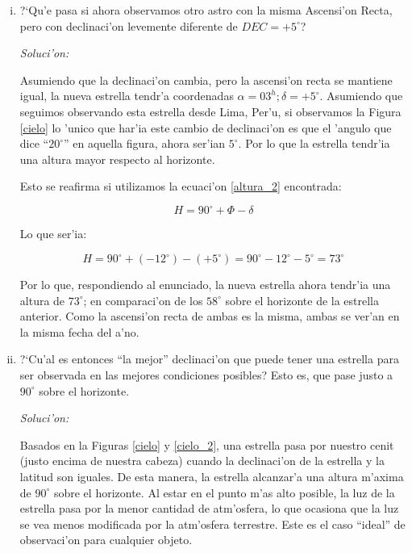 \documentclass{article}
\newenvironment{myfont}{\fontfamily{pnc}\selectfont}{\par}
\begin{document}
\begin{enumerate}[a)]
\begin{enumerate} [i)]
\begin{myfont}
\item ?`Qu'e pasa si ahora observamos otro astro con la misma Ascensi'on Recta, pero con declinaci'on levemente diferente de $DEC = +5^{\circ}$? \end{myfont}

\emph{Soluci'on:}

Asumiendo que la declinaci'on cambia, pero la ascensi'on recta se mantiene igual, la nueva estrella tendr'a coordenadas $\alpha = 03^h; \delta = +5^\circ$. Asumiendo que seguimos observando esta estrella desde Lima, Per'u, si observamos la Figura \ref{cielo} lo 'unico que har'ia este cambio de declinaci'on es que el 'angulo que dice ``$20^\circ$'' en aquella figura, ahora ser'ian $5^\circ$. Por lo que la estrella tendr'ia una altura mayor respecto al horizonte.

Esto se reafirma si utilizamos la ecuaci'on \eqref{altura_2} encontrada:

\begin{equation*}
H = 90^\circ + \Phi - \delta
\end{equation*}

Lo que ser'ia:

\begin{equation*}
H = 90^\circ + (-12^\circ) - (+5^\circ) = 90^\circ - 12^\circ - 5^\circ = 73^\circ
\end{equation*}

Por lo que, respondiendo al enunciado, la nueva estrella ahora tendr'ia una altura de $73^\circ$; en comparaci'on de los $58^\circ$ sobre el horizonte de la estrella anterior. Como la ascensi'on recta de ambas es la misma, ambas se ver'an en la misma fecha del a'no.

\begin{myfont}
\item ?`Cu'al es entonces ``la mejor'' declinaci'on que puede tener una estrella para ser observada en las mejores condiciones posibles? Esto es, que pase justo a $90^{\circ}$ sobre el horizonte. \end{myfont}

\emph{Soluci'on:}

Basados en la Figuras \ref{cielo} y \ref{cielo_2}, una estrella pasa por nuestro cenit (justo encima de nuestra cabeza) cuando la declinaci'on de la estrella y la latitud son iguales. De esta manera, la estrella alcanzar'a una altura m'axima de $90^\circ$ sobre el horizonte. Al estar en el punto m'as alto posible, la luz de la estrella pasa por la menor cantidad de atm'osfera, lo que ocasiona que la luz se vea menos modificada por la atm'osfera terrestre. Este es el caso ``ideal'' de observaci'on para cualquier objeto.


\end{enumerate}
\end{enumerate}
\end{document}
